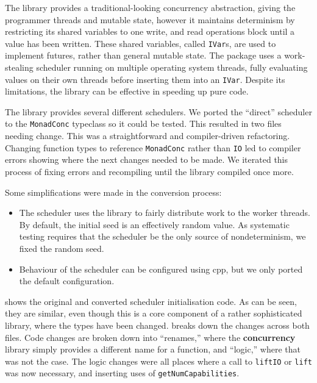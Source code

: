 The  library\cite{marlow2011} provides a
traditional-looking concurrency abstraction, giving the programmer
threads and mutable state, however it maintains determinism by
restricting its shared variables to one write, and read operations
block until a value has been written.  These shared variables, called
\verb|IVar|s, are used to implement futures, rather than general
mutable state.  The package uses a work-stealing scheduler running on
multiple operating system threads, fully evaluating values on their
own threads before inserting them into an \verb|IVar|.  Despite its
limitations, the library can be effective in speeding up pure code.

The library provides several different schedulers.  We ported the
``direct'' scheduler to the \verb|MonadConc| typeclass so it could be
tested.  This resulted in two files needing change.  This was a
straightforward and compiler-driven refactoring.  Changing function
types to reference \verb|MonadConc| rather than \verb|IO| led to
compiler errors showing where the next changes needed to be made.  We
iterated this process of fixing errors and recompiling until the
library compiled once more.

Some simplifications were made in the conversion process:

\begin{itemize}
\item The scheduler uses the  library to fairly
  distribute work to the worker threads.  By default, the initial seed
  is an effectively random value.  As systematic testing requires that
  the scheduler be the only source of nondeterminism, we fixed the
  random seed.
\item Behaviour of the scheduler can be configured using cpp, but we
  only ported the default configuration.
\end{itemize}

 shows the original and converted
scheduler initialisation code.  As can be seen, they are similar, even
though this is a core component of a rather sophisticated library,
where the types have been changed.  
breaks down the changes across both files.  Code changes are broken
down into ``renames,'' where the \textbf{concurrency} library simply
provides a different name for a function, and ``logic,'' where that
was not the case.  The logic changes were all places where a call to
\verb|liftIO| or \verb|lift| was now necessary, and inserting uses of
\verb|getNumCapabilities|.

